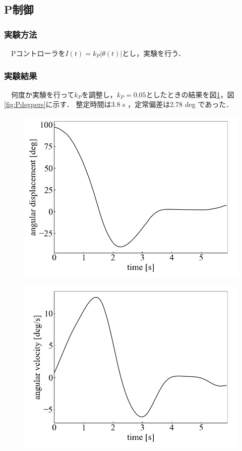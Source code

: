 \subsection{P制御}
\subsubsection{実験方法}
　Pコントローラを$I(t) = k_P |\theta(t)|$とし，実験を行う．

\subsubsection{実験結果}
　何度か実験を行って$k_P$を調整し，$k_P=0.05$としたときの結果を図\ref{fig:Pdeg}，図\ref{fig:Pdegpers}に示す．
整定時間は3.8 s ，定常偏差は2.78 deg であった．

\begin{figure}[h]
	\centering
	\begin{minipage}{0.43\columnwidth}
	  \centering
	  \includegraphics[width=\columnwidth]{./figure/Pdeg.png}
	  \label{fig:Pdeg}
	\end{minipage}
	\hspace{5mm}
	\begin{minipage}{0.43\columnwidth}
	  \centering
	  \includegraphics[width=\columnwidth]{./figure/Pdegpers.png}

\end{minipage}
\end{figure}
